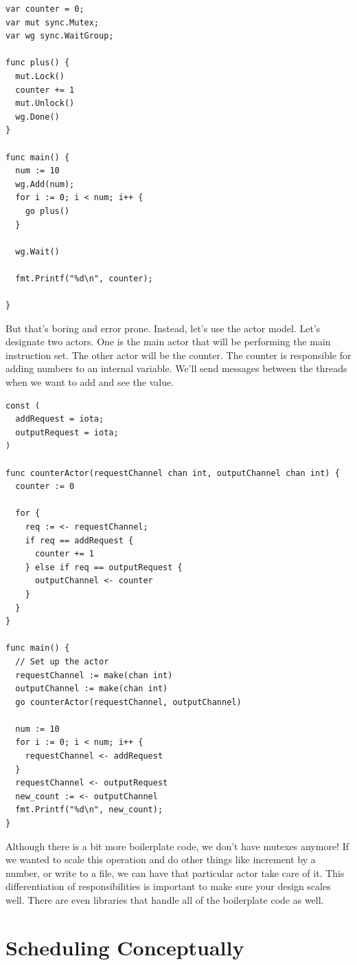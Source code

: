\begin{lstlisting}[language=golang]
var counter = 0;
var mut sync.Mutex;
var wg sync.WaitGroup;
 
func plus() {
  mut.Lock()
  counter += 1
  mut.Unlock()
  wg.Done()
}

func main() {
  num := 10
  wg.Add(num);
  for i := 0; i < num; i++ {
    go plus()
  }

  wg.Wait()

  fmt.Printf("%d\n", counter);

}
\end{lstlisting}

But that's boring and error prone.
Instead, let's use the actor model.
Let's designate two actors.
One is the main actor that will be performing the main instruction set.
The other actor will be the counter.
The counter is responsible for adding numbers to an internal variable.
We'll send messages between the threads when we want to add and see the value.


\begin{lstlisting}[language=golang]
const (
  addRequest = iota;
  outputRequest = iota;
)

func counterActor(requestChannel chan int, outputChannel chan int) {
  counter := 0

  for {
    req := <- requestChannel;
    if req == addRequest {
      counter += 1
    } else if req == outputRequest {
      outputChannel <- counter
    }
  }
}

func main() {
  // Set up the actor
  requestChannel := make(chan int)
  outputChannel := make(chan int)
  go counterActor(requestChannel, outputChannel)

  num := 10
  for i := 0; i < num; i++ {
    requestChannel <- addRequest
  }
  requestChannel <- outputRequest
  new_count := <- outputChannel
  fmt.Printf("%d\n", new_count);
}
\end{lstlisting}

Although there is a bit more boilerplate code, we don't have mutexes anymore!
If we wanted to scale this operation and do other things like increment by a number, or write to a file, we can have that particular actor take care of it.
This differentiation of responsibilities is important to make sure your design scales well.
There are even libraries that handle all of the boilerplate code as well.

\section{Scheduling Conceptually}

